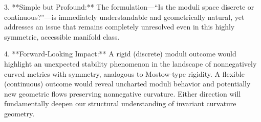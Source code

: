 3. **Simple but Profound:**  
   The formulation—“Is the moduli space discrete or continuous?”—is immediately understandable and geometrically natural, yet addresses an issue that remains completely unresolved even in this highly symmetric, accessible manifold class.  

4. **Forward‑Looking Impact:**  
   A rigid (discrete) moduli outcome would highlight an unexpected stability phenomenon in the landscape of nonnegatively curved metrics with symmetry, analogous to Mostow‑type rigidity.  A flexible (continuous) outcome would reveal uncharted moduli behavior and potentially new geometric flows preserving nonnegative curvature.  Either direction will fundamentally deepen our structural understanding of invariant curvature geometry.